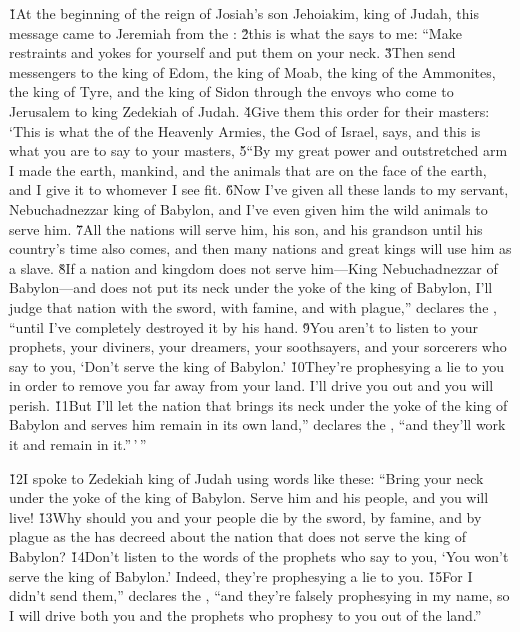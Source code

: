 \v{1}At the beginning of the reign of Josiah's son Jehoiakim, king of Judah, this message came to Jeremiah from the : \v{2}this is what the  says to me: ``Make restraints and yokes for yourself and put them on your neck. \v{3}Then send messengers to the king of Edom, the king of Moab, the king of the Ammonites, the king of Tyre, and the king of Sidon through the envoys who come to Jerusalem to king Zedekiah of Judah. \v{4}Give them this order for their masters: `This is what the  of the Heavenly Armies, the God of Israel, says, and this is what you are to say to your masters, \v{5}``By my great power and outstretched arm I made the earth, mankind, and the animals that are on the face of the earth, and I give it to whomever I see fit. \v{6}Now I've given all these lands to my servant, Nebuchadnezzar king of Babylon, and I've even given him the wild animals to serve him. \v{7}All the nations will serve him, his son, and his grandson until his country's time also comes, and then many nations and great kings will use him as a slave. \v{8}If a nation and kingdom does not serve him---King Nebuchadnezzar of Babylon---and does not put its neck under the yoke of the king of Babylon, I'll judge that nation with the sword, with famine, and with plague,'' declares the , ``until I've completely destroyed it by his hand. \v{9}You aren't to listen to your prophets, your diviners, your dreamers, your soothsayers, and your sorcerers who say to you, `Don't serve the king of Babylon.' \v{10}They're prophesying a lie to you in order to remove you far away from your land. I'll drive you out and you will perish. \v{11}But I'll let the nation that brings its neck under the yoke of the king of Babylon and serves him remain in its own land,'' declares the , ``and they'll work it and remain in it.''\,'\,''

\v{12}I spoke to Zedekiah king of Judah using words like these: ``Bring your neck under the yoke of the king of Babylon. Serve him and his people, and you will live! \v{13}Why should you and your people die by the sword, by famine, and by plague as the  has decreed about the nation that does not serve the king of Babylon? \v{14}Don't listen to the words of the prophets who say to you, `You won't serve the king of Babylon.' Indeed, they're prophesying a lie to you. \v{15}For I didn't send them,'' declares the , ``and they're falsely prophesying in my name, so I will drive both you and the prophets who prophesy to you out of the land.''

